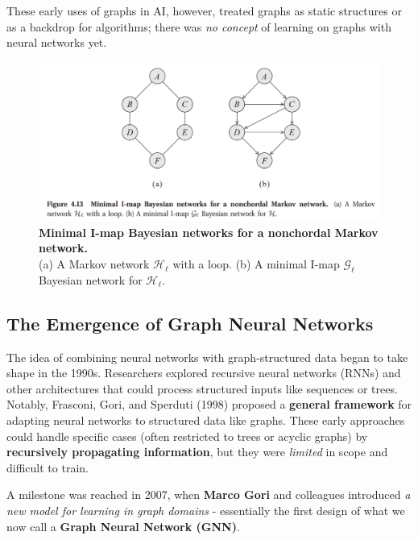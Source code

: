 \documentclass{article}
\begin{document}
These early uses of graphs in AI, however, treated graphs as static structures or as a backdrop for algorithms; there was \textit{no concept} of learning on graphs with neural networks yet.

\begin{figure}[ht]
      \centering
      \includegraphics[width=1\textwidth,trim=0 100 0 0,clip]{../assets/bayesian-and-markov-networks.png}
      \caption{\textbf{Minimal I-map Bayesian networks for a nonchordal Markov network.} \\ (a) A Markov network $\mathcal{H}_\ell$ with a loop. (b) A minimal I-map $\mathcal{G}_\ell$ Bayesian network for $\mathcal{H}_\ell$.}
      \label{fig:bayesian-networks}
\end{figure}

\subsection{The Emergence of Graph Neural Networks}

The idea of combining neural networks with graph-structured data began to take shape in the 1990s.
Researchers explored recursive neural networks (RNNs) \cite{schmidt2019recurrent} and other architectures that could process structured inputs like sequences or trees.
Notably, Frasconi, Gori, and Sperduti (1998) \cite{frasconi1998general} proposed a \textbf{general framework} for adapting neural networks to structured data like graphs.
These early approaches could handle specific cases (often restricted to trees or acyclic graphs) by \textbf{recursively propagating information}, but they were \textit{limited} in scope and difficult to train.

A milestone was reached in 2007, when \textbf{Marco Gori} and colleagues introduced \textit{a new model for learning in graph domains} \cite{gori2007new} - essentially the first design of what we now call a \textbf{Graph Neural Network (GNN)}.
\end{document}
